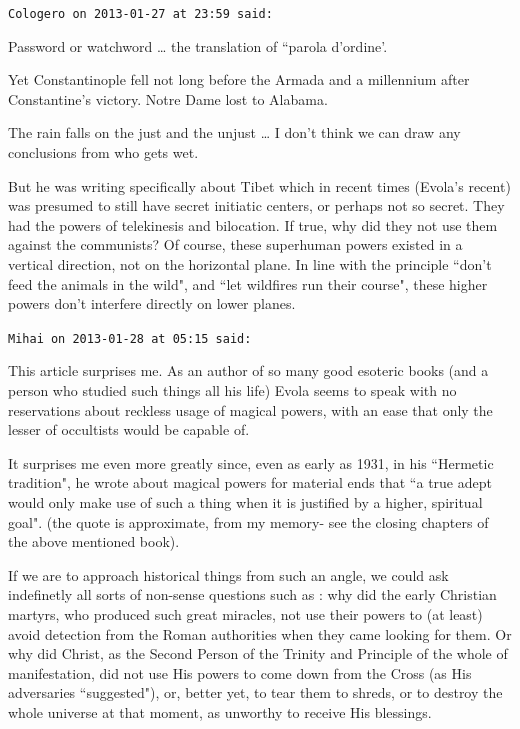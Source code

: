 \begin{footnotesize}
\begin{sffamily}
\hfill

\texttt{Cologero on 2013-01-27 at 23:59 said: }

Password or watchword … the translation of ``parola d'ordine'.

Yet Constantinople fell not long before the Armada and a millennium after Constantine's victory. Notre Dame lost to Alabama.

The rain falls on the just and the unjust … I don't think we can draw any conclusions from who gets wet.

But he was writing specifically about Tibet which in recent times (Evola's recent) was presumed to still have secret initiatic centers, or perhaps not so secret. They had the powers of telekinesis and bilocation. If true, why did they not use them against the communists? Of course, these superhuman powers existed in a vertical direction, not on the horizontal plane. In line with the principle ``don't feed the animals in the wild", and ``let wildfires run their course", these higher powers don't interfere directly on lower planes.


\hfill

\texttt{Mihai on 2013-01-28 at 05:15 said: }

This article surprises me. As an author of so many good esoteric books (and a person who studied such things all his life) Evola seems to speak with no reservations about reckless usage of magical powers, with an ease that only the lesser of occultists would be capable of. 

It surprises me even more greatly since, even as early as 1931, in his ``Hermetic tradition", he wrote about magical powers for material ends that ``a true adept would only make use of such a thing when it is justified by a higher, spiritual goal". (the quote is approximate, from my memory- see the closing chapters of the above mentioned book). 

If we are to approach historical things from such an angle, we could ask indefinetly all sorts of non-sense questions such as : why did the early Christian martyrs, who produced such great miracles, not use their powers to (at least) avoid detection from the Roman authorities when they came looking for them. Or why did Christ, as the Second Person of the Trinity and Principle of the whole of manifestation, did not use His powers to come down from the Cross (as His adversaries ``suggested"), or, better yet, to tear them to shreds, or to destroy the whole universe at that moment, as unworthy to receive His blessings.


\end{sffamily}
\end{footnotesize}
